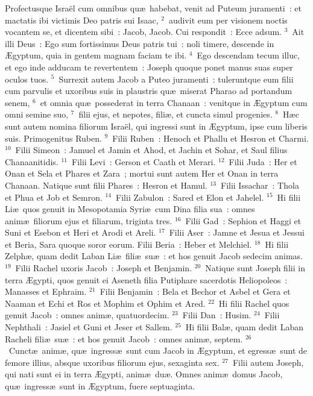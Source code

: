 \lettrine[lines=3,image=true,loversize=0.05,lraise=-0.03]{P}{}rofectusque Isra\"el cum omnibus qu\ae\ habebat, venit ad Puteum juramenti~: et mactatis ibi victimis Deo patris sui Isaac,
${}^{2}$~audivit eum per visionem noctis vocantem se, et dicentem sibi~: Jacob, Jacob. Cui respondit~: Ecce adsum.
${}^{3}$~Ait illi Deus~: Ego sum fortissimus Deus patris tui~: noli timere, descende in \AE gyptum, quia in gentem magnam faciam te ibi.
${}^{4}$~Ego descendam tecum illuc, et ego inde adducam te revertentem~: Joseph quoque ponet manus suas super oculos tuos.
${}^{5}$~Surrexit autem Jacob a Puteo juramenti~: tuleruntque eum filii cum parvulis et uxoribus suis in plaustris qu\ae\ miserat Pharao ad portandum senem,
${}^{6}$~et omnia qu\ae\ possederat in terra Chanaan~: venitque in \AE gyptum cum omni semine suo,
${}^{7}$~filii ejus, et nepotes, fili\ae , et cuncta simul progenies.
${}^{8}$~H\ae c sunt autem nomina filiorum Isra\"el, qui ingressi sunt in \AE gyptum, ipse cum liberis suis. Primogenitus Ruben.
${}^{9}$~Filii Ruben~: Henoch et Phallu et Hesron et Charmi.
${}^{10}$~Filii Simeon~: Jamuel et Jamin et Ahod, et Jachin et Sohar, et Saul filius Chanaanitidis.
${}^{11}$~Filii Levi~: Gerson et Caath et Merari.
${}^{12}$~Filii Juda~: Her et Onan et Sela et Phares et Zara~; mortui sunt autem Her et Onan in terra Chanaan. Natique sunt filii Phares~: Hesron et Hamul.
${}^{13}$~Filii Issachar~: Thola et Phua et Job et Semron.
${}^{14}$~Filii Zabulon~: Sared et Elon et Jahelel.
${}^{15}$~Hi filii Li\ae\ quos genuit in Mesopotamia Syri\ae\ cum Dina filia sua~: omnes anim\ae\ filiorum ejus et filiarum, triginta tres.
${}^{16}$~Filii Gad~: Sephion et Haggi et Suni et Esebon et Heri et Arodi et Areli.
${}^{17}$~Filii Aser~: Jamne et Jesua et Jessui et Beria, Sara quoque soror eorum. Filii Beria~: Heber et Melchiel.
${}^{18}$~Hi filii Zelph\ae , quam dedit Laban Li\ae\ fili\ae\ su\ae~: et hos genuit Jacob sedecim animas.
${}^{19}$~Filii Rachel uxoris Jacob~: Joseph et Benjamin.
${}^{20}$~Natique sunt Joseph filii in terra \AE gypti, quos genuit ei Aseneth filia Putiphare sacerdotis Heliopoleos~: Manasses et Ephraim.
${}^{21}$~Filii Benjamin~: Bela et Bechor et Asbel et Gera et Naaman et Echi et Ros et Mophim et Ophim et Ared.
${}^{22}$~Hi filii Rachel quos genuit Jacob~: omnes anim\ae , quatuordecim.
${}^{23}$~Filii Dan~: Husim.
${}^{24}$~Filii Nephthali~: Jasiel et Guni et Jeser et Sallem.
${}^{25}$~Hi filii Bal\ae , quam dedit Laban Racheli fili\ae\ su\ae~: et hos genuit Jacob~: omnes anim\ae , septem.
${}^{26}$~Cunct\ae\ anim\ae , qu\ae\ ingress\ae\ sunt cum Jacob in \AE gyptum, et egress\ae\ sunt de femore illius, absque uxoribus filiorum ejus, sexaginta sex.
${}^{27}$~Filii autem Joseph, qui nati sunt ei in terra \AE gypti, anim\ae\ du\ae . Omnes anim\ae\ domus Jacob, qu\ae\ ingress\ae\ sunt in \AE gyptum, fuere septuaginta.


